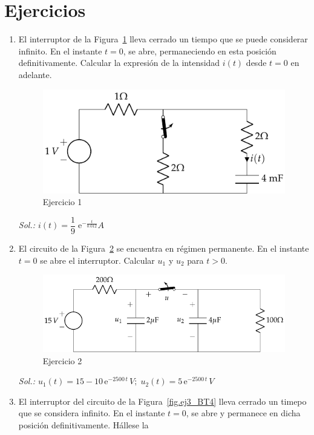 \section*{Ejercicios}
	
\begin{enumerate}
\item El interruptor de la Figura~\ref{fig.ej1_BT4} lleva cerrado un
  tiempo que se puede considerar infinito. En el instante $t=0$, se
  abre, permaneciendo en esta posición definitivamente. Calcular la
  expresión de la intensidad $i(t)$ desde $t=0$ en adelante.
  \begin{figure}[H]
    \centering \includegraphics{../figs/ej1_BT4.pdf}
    \caption{Ejercicio 1}
    \label{fig.ej1_BT4}
  \end{figure}
  \emph{Sol.: $i(t)=\dfrac{1}{9}\; \mathrm{e}^{-\frac{t}{0.012}} A$}
\item El circuito de la Figura~\ref{fig.ej2_BT4} se encuentra en
  régimen permanente. En el instante $t=0$ se abre el
  interruptor. Calcular $u_1$ y $u_2$ para $t>0$.
  \begin{figure}[H]
    \centering \includegraphics{../figs/ej2_BT4.pdf}
    \caption{Ejercicio 2}
    \label{fig.ej2_BT4}
  \end{figure}
  \emph{Sol.:
    $u_1(t)=15-10\,\mathrm{e}^{-2500\,t}\,V;\;
    u_2(t)=5\,\mathrm{e}^{-2500\,t}\,V$}
\item El interruptor del circuito de la Figura~\ref{fig.ej3_BT4} lleva
  cerrado un timepo que se considera infinito. En el instante $t=0$,
  se abre y permanece en dicha posición definitivamente. Hállese la

\end{enumerate}
